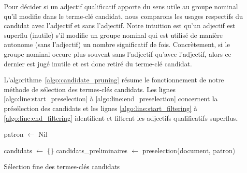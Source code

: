         Pour décider si un adjectif qualificatif apporte du sens utile au groupe
        nominal qu'il modifie dans le terme-clé candidat, nous comparons les
        usages respectifs du candidat avec l'adjectif et sans l'adjectif. Notre
        intuition est qu'un adjectif est superflu (inutile) s'il modifie un
        groupe nominal qui est utilisé de manière autonome (sans l'adjectif) un
        nombre significatif de fois. Concrètement, si le groupe nominal occure
        plus souvent sans l'adjectif qu'avec l'adjectif, alors ce dernier est
        jugé inutile et est donc retiré du terme-clé candidat.

        L'algorithme~\ref{algo:candidate_pruning} résume le fonctionnement de
        notre méthode de sélection des termes-clés candidats. Les lignes
        \ref{algo:line:start_preselection} à \ref{algo:line:end_preselection}
        concernent la présélection des candidats et les lignes
        \ref{algo:line:start_filtering} à \ref{algo:line:end_filtering}
        identifient et filtrent les adjectifs qualificatifs superflus.
        \begin{algorithm}
          \DontPrintSemicolon{}

          \BlankLine

          patron $\leftarrow$ Nil\;\label{algo:line:start_preselection}

          candidats $\leftarrow$ \{\}\;
          candidats\_preliminaires $\leftarrow$ preselection(document, patron)\;\label{algo:line:end_preselection}

          \label{algo:line:end_filtering}

          \caption{Sélection fine des termes-clés candidats
                   \label{algo:candidate_pruning}}
        \end{algorithm}

